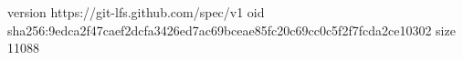 version https://git-lfs.github.com/spec/v1
oid sha256:9edca2f47caef2dcfa3426ed7ac69bceae85fc20c69cc0c5f2f7fcda2ce10302
size 11088
